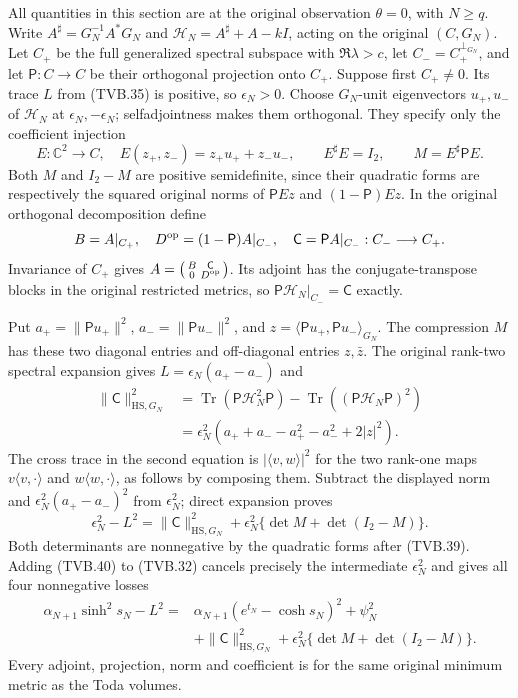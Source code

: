 \documentclass[11pt]{article}
\newcommand{\C}{\mathbb C}
\newcommand{\tr}{\operatorname{Tr}}
\begin{document}
All quantities in this section are at the original observation
$\theta=0$, with $N\ge q$. Write
$A^\sharp=G_N^{-1}A^*G_N$ and
$\mathcal H_N=A^\sharp+A-kI$, acting on the original $(C,G_N)$.
Let $C_+$ be the full generalized spectral subspace with
$\Re\lambda>c$, let $C_-=C_+^{\perp_{G_N}}$, and let
$\mathsf P:C\to C$ be their orthogonal projection onto $C_+$.
Suppose first $C_+\ne0$. Its trace $L$ from (TVB.35) is positive,
so $\epsilon_N>0$. Choose $G_N$-unit eigenvectors $u_+,u_-$
of $\mathcal H_N$ at $\epsilon_N,-\epsilon_N$; selfadjointness
makes them orthogonal. They specify only the coefficient injection
\[
 E:\C^2\longrightarrow C,\quad E(z_+,z_-)=z_+u_++z_-u_-,
 \qquad E^\sharp E=I_2,\qquad M=E^\sharp\mathsf P E.
 \tag{TVB.39}
\]
Both $M$ and $I_2-M$ are positive semidefinite, since their
quadratic forms are respectively the squared original norms of
$\mathsf PEz$ and $(1-\mathsf P)Ez$.
In the original orthogonal decomposition define
\[
 B=A|_{C_+},\quad D^{\rm op}=(1-\mathsf P)A|_{C_-},\quad
 \mathsf C=\mathsf PA|_{C_-}:C_-\longrightarrow C_+.
\]
Invariance of $C_+$ gives
$A=\left(\begin{smallmatrix}B&\mathsf C\\0&D^{\rm op}\end{smallmatrix}\right)$.
Its adjoint has the conjugate-transpose blocks in the original
restricted metrics, so
$\mathsf P\mathcal H_N|_{C_-}=\mathsf C$ exactly.

Put $a_+=\|\mathsf Pu_+\|^2$, $a_-=\|\mathsf Pu_-\|^2$,
and $z=\langle\mathsf Pu_+,\mathsf Pu_-\rangle_{G_N}$.
The compression $M$ has these two diagonal entries and off-diagonal
entries $z,\bar z$. The original rank-two spectral expansion gives
$L=\epsilon_N(a_+-a_-)$ and
\[
 \begin{split}
 \|\mathsf C\|_{\mathrm{HS},G_N}^2
 &=\tr(\mathsf P\mathcal H_N^2\mathsf P)
                 -\tr((\mathsf P\mathcal H_N\mathsf P)^2)\\
 &=\epsilon_N^2(a_++a_--a_+^2-a_-^2+2|z|^2).
 \end{split}
\]
The cross trace in the second equation is $|\langle v,w\rangle|^2$
for the two rank-one maps $v\langle v,\cdot\rangle$ and
$w\langle w,\cdot\rangle$, as follows by composing them.
Subtract the displayed norm and $\epsilon_N^2(a_+-a_-)^2$
from $\epsilon_N^2$; direct expansion proves
\[
 \epsilon_N^2-L^2
 =\|\mathsf C\|_{\mathrm{HS},G_N}^2
       +\epsilon_N^2\{\det M+\det(I_2-M)\}.
 \tag{TVB.40}
\]
Both determinants are nonnegative by the quadratic forms after
(TVB.39). Adding (TVB.40) to (TVB.32) cancels precisely the
intermediate $\epsilon_N^2$ and gives all four nonnegative losses
\[
 \boxed{\begin{aligned}
 \alpha_{N+1}\sinh^2s_N-L^2
 ={}&\alpha_{N+1}(e^{t_N}-\cosh s_N)^2+\psi_N^2\\
 &+\|\mathsf C\|_{\mathrm{HS},G_N}^2
       +\epsilon_N^2\{\det M+\det(I_2-M)\}.
 \end{aligned}}
 \tag{TVB.41}
\]
Every adjoint, projection, norm and coefficient is for the same
original minimum metric as the Toda volumes.
\end{document}
